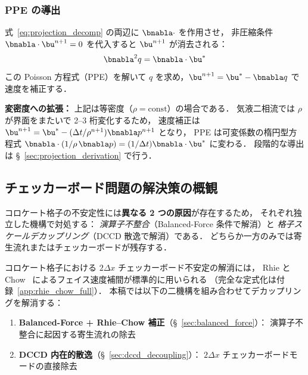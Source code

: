 \subsubsection{PPE の導出}

式~\eqref{eq:projection_decomp} の両辺に $\bnabla\cdot$ を作用させ，
非圧縮条件 $\bnabla\cdot\bu^{n+1}=0$ を代入すると $\bu^{n+1}$ が消去される：
\begin{equation}
  \bnabla^2q = \bnabla\cdot\bu^*
  \label{eq:why_divergence}
\end{equation}
この Poisson 方程式（PPE）を解いて $q$ を求め，$\bu^{n+1} = \bu^* - \bnabla q$ で速度を補正する．

\noindent\textbf{変密度への拡張：}
上記は等密度（$\rho = \mathrm{const}$）の場合である．
気液二相流では $\rho$ が界面をまたいで 2--3 桁変化するため，
速度補正は $\bu^{n+1} = \bu^* - (\Delta t/\rho^{n+1})\bnabla p^{n+1}$ となり，
PPE は可変係数の楕円型方程式 $\bnabla\cdot(1/\rho\,\bnabla p) = (1/\Delta t)\bnabla\cdot\bu^*$ に変わる．
段階的な導出は §~\ref{sec:projection_derivation} で行う．

\subsection{チェッカーボード問題の解決策の概観}
\label{sec:checkerboard_solution}

コロケート格子の不安定性には\textbf{異なる 2 つの原因}が存在するため，
それぞれ独立した機構で対処する：
\emph{演算子不整合}（Balanced-Force 条件で解消）と
\emph{格子スケールデカップリング}（DCCD 散逸で解消）である．
どちらか一方のみでは寄生流れまたはチェッカーボードが残存する．

コロケート格子における $2\Delta x$ チェッカーボード不安定の解消には，
Rhie と Chow~\cite{RhieChow1983} によるフェイス速度補間が標準的に用いられる
（完全な定式化は付録~\ref{app:rhie_chow_full}）．
本稿では以下の二機構を組み合わせてデカップリングを解消する：
\begin{enumerate}[noitemsep]
  \item \textbf{Balanced-Force + Rhie--Chow 補正}（§~\ref{sec:balanced_force}）：
        演算子不整合に起因する寄生流れの除去
  \item \textbf{DCCD 内在的散逸}（§~\ref{sec:dccd_decoupling}）：
        $2\Delta x$ チェッカーボードモードの直接除去
\end{enumerate}

